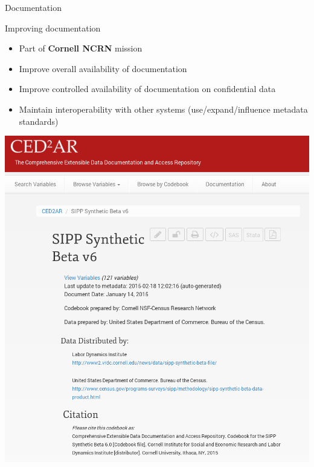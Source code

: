 \begin{frame}{Documentation}
\begin{block}{Improving documentation}
\begin{itemize}[<+->]
\item Part of {\bf Cornell NCRN} mission
\item Improve overall availability of documentation
\item Improve controlled availability of documentation on confidential data 
\item Maintain interoperability with other systems (use/expand/influence metadata standards)
\end{itemize}
\end{block}
\end{frame}


\begin{frame}
\centering
\includegraphics[height=0.9\textheight]{Selection_080.png}
\end{frame}

